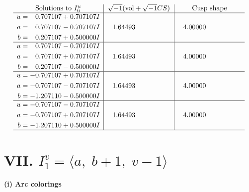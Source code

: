 \documentclass[1p]{elsarticle_modified}
\theoremstyle{definition}
\newcommand{\I}{\sqrt{-1}}
\begin{document}
$$\begin{array}{c|c|c}  
\text{Solutions to }I^u_{6}& \I (\text{vol} + \sqrt{-1}CS) & \text{Cusp shape}\\
 \hline 
\begin{aligned}
u &= \phantom{-}0.707107 + 0.707107 I \\
a &= \phantom{-}0.707107 - 0.707107 I \\
b &= \phantom{-}0.207107 + 0.500000 I\end{aligned}
 & \phantom{-}1.64493\phantom{ +0.000000I} & \phantom{-}4.00000\phantom{ +0.000000I} \\ \hline\begin{aligned}
u &= \phantom{-}0.707107 - 0.707107 I \\
a &= \phantom{-}0.707107 + 0.707107 I \\
b &= \phantom{-}0.207107 - 0.500000 I\end{aligned}
 & \phantom{-}1.64493\phantom{ +0.000000I} & \phantom{-}4.00000\phantom{ +0.000000I} \\ \hline\begin{aligned}
u &= -0.707107 + 0.707107 I \\
a &= -0.707107 - 0.707107 I \\
b &= -1.207110 - 0.500000 I\end{aligned}
 & \phantom{-}1.64493\phantom{ +0.000000I} & \phantom{-}4.00000\phantom{ +0.000000I} \\ \hline\begin{aligned}
u &= -0.707107 - 0.707107 I \\
a &= -0.707107 + 0.707107 I \\
b &= -1.207110 + 0.500000 I\end{aligned}
 & \phantom{-}1.64493\phantom{ +0.000000I} & \phantom{-}4.00000\phantom{ +0.000000I}\\
 \hline 
 \end{array}$$\newpage\newpage\renewcommand{\arraystretch}{1}
\centering \section*{VII. $I^v_{1}= \langle a,\;b+1,\;v-1 \rangle$}
\flushleft \textbf{(i) Arc colorings}\\
\end{document}
